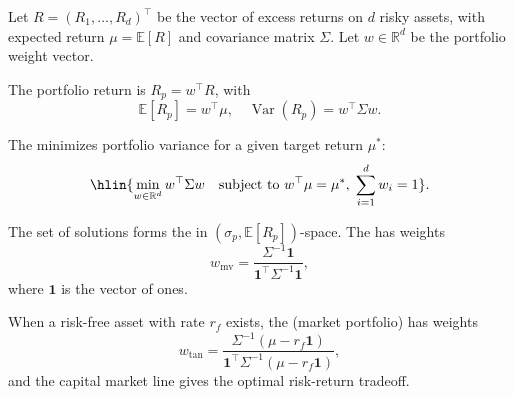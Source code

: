 \begin{definition} \label{definition:markowitz_mean_variance_portfolio_optimization}
Let $R = (R_1, \dots, R_d)^\top$ be the vector of excess returns on $d$ risky assets, with expected return $\mu = \mathbb{E}[R]$ and covariance matrix $\Sigma$. Let $w \in \mathbb{R}^d$ be the portfolio weight vector.

The portfolio return is $R_p = w^\top R$, with
$$\mathbb{E}[R_p] = w^\top \mu, \quad \operatorname{Var}(R_p) = w^\top \Sigma w.$$

The  minimizes portfolio variance for a given target return $\mu^*$:
$$\hlin{\min_{w \in \mathbb{R}^d} w^\top \Sigma w \quad \text{subject to } w^\top \mu = \mu^*, \; \sum_{i=1}^d w_i = 1}.$$

The set of solutions forms the  in $(\sigma_p, \mathbb{E}[R_p])$-space. The  has weights
$$w_{\text{mv}} = \frac{\Sigma^{-1}\mathbf{1}}{\mathbf{1}^\top \Sigma^{-1}\mathbf{1}},$$
where $\mathbf{1}$ is the vector of ones.

When a risk-free asset with rate $r_f$ exists, the  (market portfolio) has weights
$$w_{\text{tan}} = \frac{\Sigma^{-1}(\mu - r_f\mathbf{1})}{\mathbf{1}^\top \Sigma^{-1}(\mu - r_f\mathbf{1})},$$
and the capital market line gives the optimal risk-return tradeoff.
\end{definition}